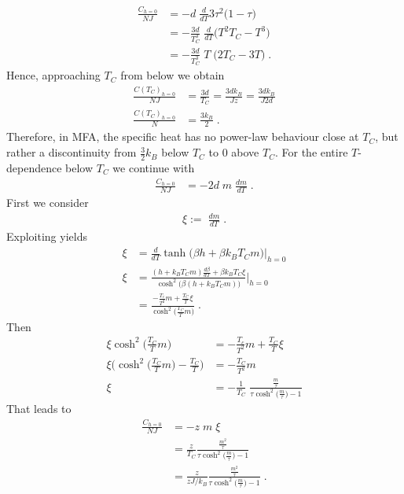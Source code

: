 \begin{align*}
\frac{C_{h=0}}{N J} &= -d   \;\frac{d   }{d T}  3 \tau^{2}\big( 1-\tau \big)\\
&=- \frac{3d}{T_{C}^{3}}   \;\frac{d   }{d T}   \big( T^{2} T_{C}- T^{3} \big)\\
&=- \frac{3d}{T_{C}^{3}}   \;T\; \big( 2  T_{C}- 3 T \big)\;.
\end{align*}
Hence, approaching $T_{C}$ from below we obtain
%
\begin{align}\label{spec:heat:MFA}
\frac{C(T_{C})_{h=0}}{N J}
&= \frac{3d}{T_{C}} =  \frac{3d k_{B}}{J z} =\frac{3d k_{B}}{J 2d}\\
\frac{C(T_{C})_{h=0}}{N} &= \frac{3k_{B}}{2}\;.
\end{align}
%
Therefore, in MFA, the specific heat has no power-law behaviour close at $T_{C}$, but rather a 
discontinuity from $\frac{3}{2}k_{B}$ below $T_{C}$ to 0 above $T_{C}$.
For the entire $T$-dependence below $T_{C}$ we continue with
%
\begin{align}
\frac{C_{h=0}}{N J} &= - 2 d\;   m\;\frac{d m}{d T} \;.
\end{align}
%
First we consider
%
\begin{align*}
\xi :=\;\frac{d m}{d T}  \;.
\end{align*}
%
Exploiting  yields
\begin{align}
\xi &= \frac{d}{dT} \tanh\big( \beta h + \beta k_{B} T_{C} m \big)\bigg|_{h=0}\\
\xi &= \frac{(h +  k_{B} T_{C} m )\frac{ d \beta}{dT} + \beta k_{B}T_{C} \xi}{\cosh^{2}\big( \beta (h +  k_{B} T_{C} m )\big)}\bigg|_{h=0}\\
 &= \frac{-\frac{T_{c}}{T^{2}}  m + \frac{T_{C}}{T} \xi}{\cosh^{2}\big( \frac{T_{C}}{T} m \big)}\;.
\end{align}
%
Then
%
\begin{align*}
\xi \cosh^{2}\big( \frac{T_{C}}{T} m \big) 
 &= -\frac{T_{c}}{T^{2}}  m + \frac{T_{C}}{T} \xi\\
\xi \bigg(\cosh^{2}\big( \frac{T_{C}}{T} m \big) -\frac{T_{C}}{T}\bigg)
 &= -\frac{T_{C}}{T^{2}}  m \\
\xi &= -\frac{1}{T_{C}}\;
\frac{\frac{m}{\tau}}{ \tau \cosh^{2}\big( \frac{m}{\tau} \big) - 1 }
\end{align*}
%
That leads to
%
\begin{align*}
\frac{C_{h=0}}{N J} &= - z\;   m\;\xi\\
&=\frac{z}{T_{C}} 
\frac{\frac{m^{2}}{\tau}}{ \tau \cosh^{2}\big( \frac{m}{\tau} \big) - 1 }\\
&=\frac{z}{z J/k_{B}} 
\frac{\frac{m^{2}}{\tau}}{ \tau \cosh^{2}\big( \frac{m}{\tau} \big) - 1 }\;.
\end{align*}
